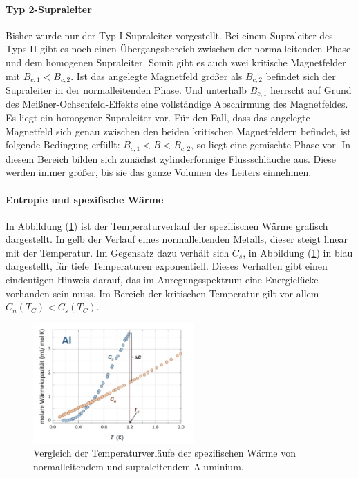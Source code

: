 \paragraph{Typ 2-Supraleiter}
\label{para:typ2}
Bisher wurde nur der Typ I-Supraleiter vorgestellt.
Bei einem Supraleiter des Typs-II gibt es noch einen \"{U}bergangsbereich zwischen der normalleitenden Phase und dem homogenen Supraleiter.
Somit gibt es auch zwei kritische Magnetfelder mit $B_{c,1} < B_{c,2}$.
Ist das angelegte Magnetfeld gr\"{o}{\ss}er als $B_{c,2}$ befindet sich der Supraleiter in der normalleitenden Phase.
Und unterhalb $B_{c,1}$ herrscht auf Grund des Mei{\ss}ner-Ochsenfeld-Effekts eine vollst\"andige Abschirmung des Magnetfeldes.
Es liegt ein homogener Supraleiter vor.
F\"{u}r den Fall, dass das angelegte Magnetfeld sich genau zwischen den beiden kritischen Magnetfeldern befindet, ist folgende Bedingung erf\"{u}llt: $B_{c,1} < B < B_{c,2}$, so liegt eine gemischte Phase vor.
In diesem Bereich bilden sich zun\"{a}chst zylinderf\"{o}rmige Flussschl\"{a}uche aus.
Diese werden immer gr\"{o}{\ss}er, bis sie das ganze Volumen des Leiters einnehmen.

\paragraph{Entropie und spezifische W\"{a}rme}
In Abbildung (\ref{abb:spezWaerme}) ist der Temperaturverlauf der spezifischen W\"{a}rme grafisch dargestellt.
In gelb der Verlauf eines normalleitenden Metalls, dieser steigt linear mit der Temperatur.
Im Gegensatz dazu verh\"{a}lt sich $C_s$, in Abbildung (\ref{abb:spezWaerme}) in blau dargestellt, f\"ur tiefe Temperaturen exponentiell.
Dieses Verhalten gibt einen eindeutigen Hinweis darauf, das im Anregungsspektrum eine Energiel\"ucke vorhanden sein muss.
Im Bereich der kritischen Temperatur gilt vor allem $C_n(T_C) < C_s(T_C)$.
\begin{figure}[hbtp]
	\centering
	\includegraphics[width=0.55\textwidth]{Plots/spezWaerme.png}
	\caption{Vergleich der Temperaturverl\"{a}ufe der spezifischen W\"{a}rme von normalleitendem und supraleitendem Aluminium. \cite{anleitung}}
	\label{abb:spezWaerme}
\end{figure}


